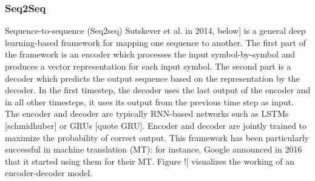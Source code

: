 \subsubsection{Seq2Seq} \label{subsubsec:seq2seq}
Sequence-to-sequence (Seq2seq) Sutskever et al. in 2014, below] is a general deep learning-based framework for mapping one sequence to another. The first part of the framework is an encoder which processes the input symbol-by-symbol and produces a vector representation for each input symbol. The second part is a decoder which predicts the output sequence based on the representation by the decoder. In the first timestep, the decoder uses the last output of the encoder and in all other timesteps, it uses its output from the previous time step as input. The encoder and decoder are typically RNN-based networks such as LSTMs [schmidhuber] or GRUs [quote GRU]. Encoder and decoder are jointly trained to maximize the probability of correct output. This framework has been particularly successful in machine translation (MT): for instance, Google announced in 2016 that it started using them for their MT. Figure ![ visualizes the working of an encoder-decoder model.

